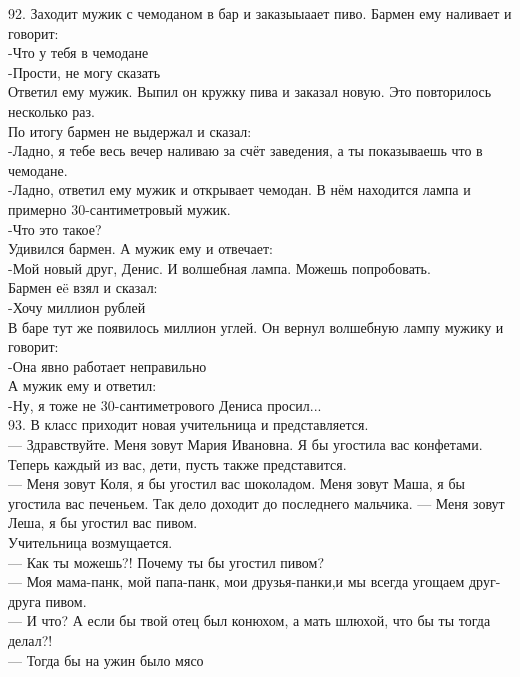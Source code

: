 \documentclass[a4paper,20pt,notitlepage]{extbook}
\begin{document}
	92. Заходит мужик с чемоданом в бар и заказыыаает пиво. Бармен ему наливает и говорит:\\
	-Что у тебя в чемодане\\
	-Прости, не могу сказать\\
	Ответил ему мужик. Выпил он кружку пива и заказал новую. Это повторилось несколько раз.\\
	 По итогу бармен не выдержал и сказал:\\
	-Ладно, я тебе весь вечер наливаю за счёт заведения, а ты показываешь что в чемодане.\\
	-Ладно, ответил ему мужик и открывает чемодан. В нём находится лампа и примерно 30-сантиметровый мужик.\\
	-Что это такое?\\
	Удивился бармен. А мужик ему и отвечает:\\
	-Мой новый друг, Денис. И волшебная лампа. Можешь попробовать.\\
	Бармен еë взял и сказал:\\
	-Хочу миллион рублей\\
	В баре тут же появилось миллион углей. Он вернул волшебную лампу мужику и говорит:\\
	-Она явно работает неправильно\\
	А мужик ему и ответил:\\
	-Ну, я тоже не 30-сантиметрового Дениса просил...\\
	
	93. В класс приходит новая учительница и представляется. \\
	— Здравствуйте. Меня зовут Мария Ивановна. Я бы угостила вас конфетами. Теперь каждый из вас, дети, пусть также представится. \\
	— Меня зовут Коля, я бы угостил вас шоколадом. Меня зовут Маша, я бы угостила вас печеньем. Так дело доходит до последнего мальчика.
	— Меня зовут Леша, я бы угостил вас пивом.\\
	Учительница возмущается.\\
	— Как ты можешь?! Почему ты бы угостил пивом?\\
	— Моя мама-панк, мой папа-панк, мои друзья-панки,и мы всегда угощаем друг-друга пивом.\\
	— И что? А если бы твой отец был конюхом, а мать шлюхой, что бы ты тогда делал?!\\
	— Тогда бы на ужин было мясо\\
	
\end{document}
